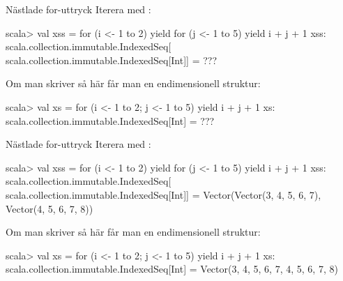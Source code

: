 







\begin{Slide}{Nästlade for-uttryck}\SlideFontSmall
Iterera med :\\

\begin{REPL}
scala> val xss = for (i <- 1 to 2) yield {
                   for (j <- 1 to 5) yield i + j + 1
                 }
xss:
  scala.collection.immutable.IndexedSeq[
    scala.collection.immutable.IndexedSeq[Int]] =
      ???

\end{REPL}
Om man skriver så här får man en endimensionell struktur:
\begin{REPL}
scala> val xs = for (i <- 1 to 2; j <- 1 to 5) yield i + j + 1
xs:
  scala.collection.immutable.IndexedSeq[Int] =
    ???

\end{REPL}
\end{Slide}

\begin{Slide}{Nästlade for-uttryck}\SlideFontSmall
Iterera med :\\
\begin{REPL}
scala> val xss = for (i <- 1 to 2) yield {
                   for (j <- 1 to 5) yield i + j + 1
                 }
xss:
  scala.collection.immutable.IndexedSeq[
    scala.collection.immutable.IndexedSeq[Int]] =
      Vector(Vector(3, 4, 5, 6, 7), Vector(4, 5, 6, 7, 8))

\end{REPL}
Om man skriver så här får man en endimensionell struktur:
\begin{REPL}
scala> val xs = for (i <- 1 to 2; j <- 1 to 5) yield i + j + 1
xs:
  scala.collection.immutable.IndexedSeq[Int] =
    Vector(3, 4, 5, 6, 7, 4, 5, 6, 7, 8)

\end{REPL}
\end{Slide}



